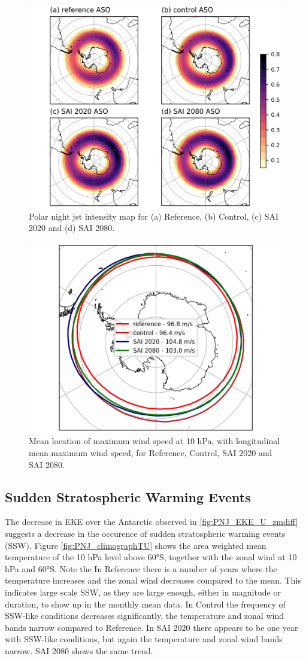 \begin{figure}[H]
	\centering
	\includegraphics[width=0.95\linewidth]{images/PNJ_map.png}
	\caption{Polar night jet intensity map for (a) Reference, (b) Control, (c) SAI 2020 and (d) SAI 2080.}
	\label{fig:PNJ_map}
\end{figure}


\begin{figure}[H]
	\centering
	\includegraphics[width=0.48\linewidth]{images/PNJ_maxloc_latlon.png}
	\caption{Mean location of maximum wind speed at 10 hPa, with longitudinal mean maximum wind speed, for Reference, Control, SAI 2020 and SAI 2080.}
	\label{fig:PNJ_maxloc}
\end{figure}

\subsection{Sudden Stratospheric Warming Events}
The decrease in EKE over the Antarctic observed in \ref{fig:PNJ_EKE_U_zmdiff} suggests a decrease in the occurence of sudden stratospheric warming events (SSW). Figure \ref{fig:PNJ_climographTU} shows the area weighted mean temperature of the 10 hPa level above 60°S, together with the zonal wind at 10 hPa and 60°S. Note the  In Reference there is a number of years where the temperature increases and the zonal wind decreases compared to the mean. This indicates large scale SSW, as they are large enough, either in magnitude or duration, to show up in the monthly mean data. In Control the frequency of SSW-like conditions decreases significantly, the temperature and zonal wind bands narrow compared to Reference. In SAI 2020 there appears to be one year with SSW-like conditions, but again the temperature and zonal wind bands narrow. SAI 2080 shows the same trend. 

